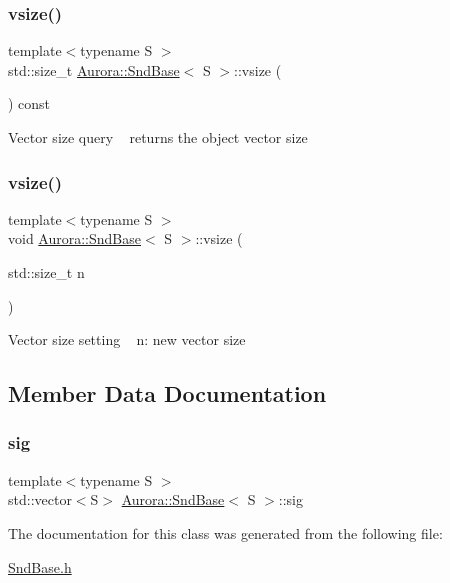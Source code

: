 \subsubsection{\texorpdfstring{vsize()}{vsize()}\hspace{0.1cm}{\footnotesize\ttfamily [1/2]}}
{\footnotesize\ttfamily template$<$typename S $>$ \\
std\+::size\+\_\+t \hyperlink{class_aurora_1_1_snd_base}{Aurora\+::\+Snd\+Base}$<$ S $>$\+::vsize (\begin{DoxyParamCaption}{ }\end{DoxyParamCaption}) const\hspace{0.3cm}{\ttfamily [inline]}}

Vector size query ~\newline
returns the object vector size \mbox{\label{class_aurora_1_1_snd_base_a88dacba995eef179f2fc97e11a331913}} 
\subsubsection{\texorpdfstring{vsize()}{vsize()}\hspace{0.1cm}{\footnotesize\ttfamily [2/2]}}
{\footnotesize\ttfamily template$<$typename S $>$ \\
void \hyperlink{class_aurora_1_1_snd_base}{Aurora\+::\+Snd\+Base}$<$ S $>$\+::vsize (\begin{DoxyParamCaption}\item[{std\+::size\+\_\+t}]{n }\end{DoxyParamCaption})\hspace{0.3cm}{\ttfamily [inline]}}

Vector size setting ~\newline
n\+: new vector size 

\subsection{Member Data Documentation}
\mbox{\label{class_aurora_1_1_snd_base_adad6cd3430a1510dc887cc6bd1a45658}} 
\subsubsection{\texorpdfstring{sig}{sig}}
{\footnotesize\ttfamily template$<$typename S $>$ \\
std\+::vector$<$S$>$ \hyperlink{class_aurora_1_1_snd_base}{Aurora\+::\+Snd\+Base}$<$ S $>$\+::sig\hspace{0.3cm}{\ttfamily [protected]}}



The documentation for this class was generated from the following file\+:\begin{DoxyCompactItemize}
\item 
\hyperlink{_snd_base_8h}{Snd\+Base.\+h}\end{DoxyCompactItemize}
